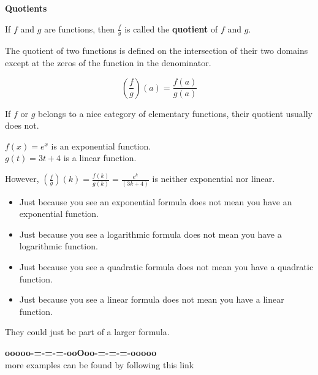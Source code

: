 \documentclass{ximera}
\begin{document}
\begin{template}  \textbf{\textcolor{blue!55!black}{Quotients}} 


If  $f$ and $g$ are functions, then $\frac{f}{g}$ is called the \textbf{quotient} of $f$ and $g$. 

The quotient of two functions is defined on the intersection of their two domains except at the zeros of the function in the denominator. 


\[ \left(\frac{f}{g}\right)(a) = \frac{f(a)}{g(a)}  \]



\end{template}



\begin{warning}

If $f$ or $g$ belongs to a nice category of elementary functions, their quotient usually does not.

\end{warning}





\begin{example}

$f(x) = e^x$ is an exponential function. \\
$g(t) = 3 t + 4$ is a linear function. 

However, $\left(\frac{f}{g}\right)(k) = \frac{f(k)}{g(k)} = \frac{e^k}{(3 k + 4)}$ is neither exponential nor linear.

\end{example}











\begin{warning}


\begin{itemize}
\item Just because you see an exponential formula does not mean you have an exponential function. 
\item Just because you see a logarithmic formula does not mean you have a logarithmic function. 
\item Just because you see a quadratic formula does not mean you have a quadratic function. 
\item Just because you see a linear formula does not mean you have a linear function. 
\end{itemize}


They could just be part of a larger formula.


\end{warning}












\begin{center}
\textbf{\textcolor{green!50!black}{ooooo-=-=-=-ooOoo-=-=-=-ooooo}} \\

more examples can be found by following this link\\ 

\end{center}
\end{document}
